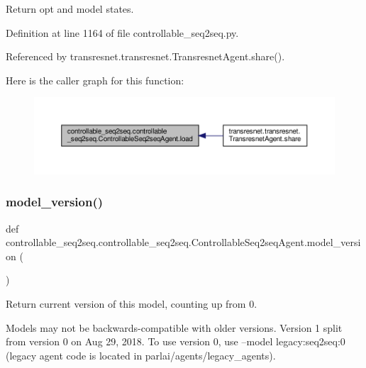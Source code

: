 \begin{DoxyVerb}Return opt and model states.\end{DoxyVerb}
 

Definition at line 1164 of file controllable\+\_\+seq2seq.\+py.



Referenced by transresnet.\+transresnet.\+Transresnet\+Agent.\+share().

Here is the caller graph for this function\+:
\nopagebreak
\begin{figure}[H]
\begin{center}
\leavevmode
\includegraphics[width=350pt]{classcontrollable__seq2seq_1_1controllable__seq2seq_1_1ControllableSeq2seqAgent_a86c91e473f1a1d2345aa70658f0acbeb_icgraph}
\end{center}
\end{figure}
\mbox{\label{classcontrollable__seq2seq_1_1controllable__seq2seq_1_1ControllableSeq2seqAgent_a8995fe4b50a61a5b6c139d26dbb57ca2}} 
\subsubsection{\texorpdfstring{model\+\_\+version()}{model\_version()}}
{\footnotesize\ttfamily def controllable\+\_\+seq2seq.\+controllable\+\_\+seq2seq.\+Controllable\+Seq2seq\+Agent.\+model\+\_\+version (\begin{DoxyParamCaption}{ }\end{DoxyParamCaption})\hspace{0.3cm}{\ttfamily [static]}}

\begin{DoxyVerb}Return current version of this model, counting up from 0.

Models may not be backwards-compatible with older versions.
Version 1 split from version 0 on Aug 29, 2018.
To use version 0, use --model legacy:seq2seq:0
(legacy agent code is located in parlai/agents/legacy_agents).
\end{DoxyVerb}
 

